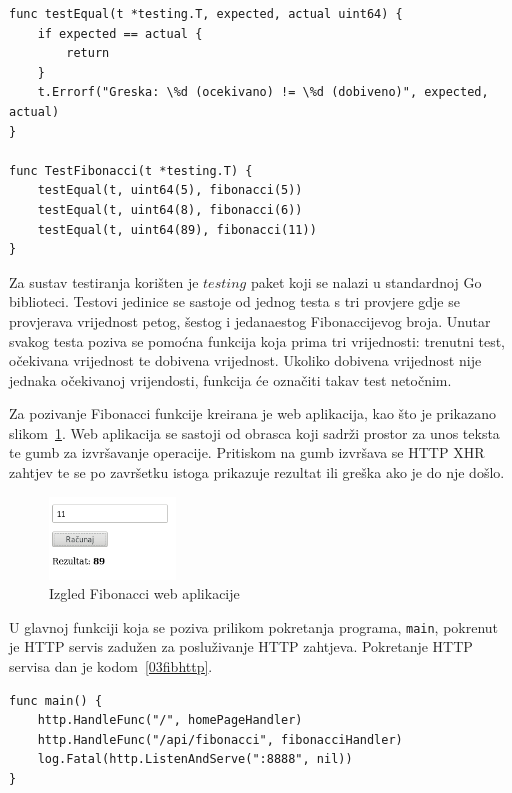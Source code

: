 \begin{lstlisting}[float=h]
func testEqual(t *testing.T, expected, actual uint64) {
	if expected == actual {
		return
	}
	t.Errorf("Greska: \%d (ocekivano) != \%d (dobiveno)", expected, actual)
}

func TestFibonacci(t *testing.T) {
	testEqual(t, uint64(5), fibonacci(5))
	testEqual(t, uint64(8), fibonacci(6))
	testEqual(t, uint64(89), fibonacci(11))
}

\end{lstlisting}

Za sustav testiranja korišten je $testing$ paket koji se nalazi u standardnoj Go biblioteci. Testovi
jedinice se sastoje od jednog testa s tri provjere gdje se provjerava vrijednost petog, šestog i
jedanaestog Fibonaccijevog broja.  Unutar svakog testa poziva se pomoćna funkcija koja prima tri
vrijednosti: trenutni test, očekivana vrijednost te dobivena vrijednost. Ukoliko dobivena vrijednost
nije jednaka očekivanoj vrijendosti, funkcija će označiti takav test netočnim.

Za pozivanje Fibonacci funkcije kreirana je web aplikacija, kao što je prikazano
slikom~\ref{fig:03fibv1png}. Web aplikacija se sastoji od obrasca koji sadrži prostor za unos teksta
te gumb za izvršavanje operacije. Pritiskom na gumb izvršava se HTTP XHR zahtjev te se po završetku
istoga prikazuje rezultat ili greška ako je do nje došlo.

\begin{figure}[h]
    \centering
    \includegraphics[width=0.3\textwidth]{img/03/fibonacci_html.png}
    \caption{Izgled Fibonacci web aplikacije}%
    \label{fig:03fibv1png}
\end{figure}

U glavnoj funkciji koja se poziva prilikom pokretanja programa, \texttt{main}, pokrenut je HTTP
servis zadužen za posluživanje HTTP zahtjeva. Pokretanje HTTP servisa dan je kodom~\ref{03fibhttp}.

\begin{lstlisting}[float=h]
func main() {
	http.HandleFunc("/", homePageHandler)
	http.HandleFunc("/api/fibonacci", fibonacciHandler)
	log.Fatal(http.ListenAndServe(":8888", nil))
}
\end{lstlisting}

